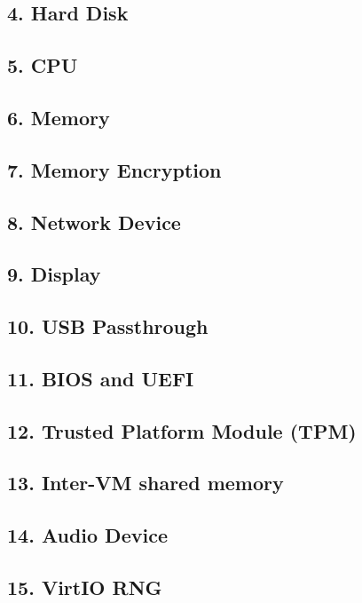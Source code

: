 \subsection{4. Hard Disk}

\subsection{5. CPU}

\subsection{6. Memory}

\subsection{7. Memory Encryption}

\subsection{8. Network Device}

\subsection{9. Display}

\subsection{10. USB Passthrough}

\subsection{11. BIOS and UEFI}

\subsection{12. Trusted Platform Module (TPM)}

\subsection{13. Inter-VM shared memory}

\subsection{14. Audio Device}

\subsection{15. VirtIO RNG}

